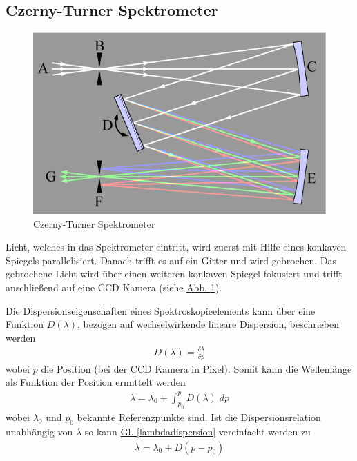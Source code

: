   \subsection{Czerny-Turner Spektrometer}
    \begin{figure}[H]
    	\centering
    	\includegraphics[scale=0.5]{parts/czernyTurnerSpectrometer_Wikipedia}
    	\caption{Czerny-Turner Spektrometer \cite{czerny.turner}}\label{fig:czernyTurnerSpectrometer}
    \end{figure}

    Licht, welches in das Spektrometer eintritt, wird zuerst mit Hilfe eines konkaven Spiegels parallelisiert. Danach trifft es auf ein Gitter und wird gebrochen. Das gebrochene Licht wird über einen weiteren konkaven Spiegel fokusiert und trifft anschließend auf eine CCD Kamera (siehe \hyperref[fig:czernyTurnerSpectrometer]{Abb. \ref*{fig:czernyTurnerSpectrometer}}).

    Die Dispersionseigenschaften eines Spektroskopieelements kann über eine Funktion $D(\lambda)$, bezogen auf wechselwirkende lineare Dispersion, beschrieben werden
    \begin{align}
    	D(\lambda) = \frac{\delta \lambda}{\delta p}
    \end{align}
    wobei $p$ die Position (bei der CCD Kamera in Pixel). Somit kann die Wellenlänge als Funktion der Position ermittelt werden
    \begin{align}
    	\lambda = \lambda_0 + \int_{p_0}^{p} D(\lambda) \; dp \label{lambdadispersion}
    \end{align}
    wobei $\lambda_0$ und $p_0$ bekannte Referenzpunkte sind. Ist die Dispersionsrelation unabhängig von $\lambda$ so kann \hyperref[lambdadispersion]{Gl. \eqref{lambdadispersion}} vereinfacht werden zu
    \begin{align}
    	\lambda = \lambda_0 + D(p - p_0)
    \end{align}

